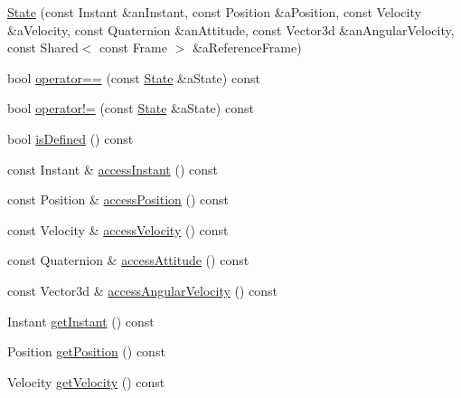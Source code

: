 \begin{DoxyCompactItemize}
\item 
\hyperlink{classostk_1_1astro_1_1flight_1_1profile_1_1_state_aa68f2e3268146c8bcb581beb8dcd5412}{State} (const Instant \&an\+Instant, const Position \&a\+Position, const Velocity \&a\+Velocity, const Quaternion \&an\+Attitude, const Vector3d \&an\+Angular\+Velocity, const Shared$<$ const Frame $>$ \&a\+Reference\+Frame)
\item 
bool \hyperlink{classostk_1_1astro_1_1flight_1_1profile_1_1_state_a4f6023c3c1d9590ec701bf10b0724ebf}{operator==} (const \hyperlink{classostk_1_1astro_1_1flight_1_1profile_1_1_state}{State} \&a\+State) const
\item 
bool \hyperlink{classostk_1_1astro_1_1flight_1_1profile_1_1_state_a300ff5bdda0b2bba50912f95287aba5e}{operator!=} (const \hyperlink{classostk_1_1astro_1_1flight_1_1profile_1_1_state}{State} \&a\+State) const
\item 
bool \hyperlink{classostk_1_1astro_1_1flight_1_1profile_1_1_state_ab69f291582ca4b31c9f340d9d5f83269}{is\+Defined} () const
\item 
const Instant \& \hyperlink{classostk_1_1astro_1_1flight_1_1profile_1_1_state_a6537111ca0de878dc9ccba7fbc037d41}{access\+Instant} () const
\item 
const Position \& \hyperlink{classostk_1_1astro_1_1flight_1_1profile_1_1_state_a92a98a15aac3aff680a619cc925f45c6}{access\+Position} () const
\item 
const Velocity \& \hyperlink{classostk_1_1astro_1_1flight_1_1profile_1_1_state_af24c195994d32133d7ab9dbcc0124aed}{access\+Velocity} () const
\item 
const Quaternion \& \hyperlink{classostk_1_1astro_1_1flight_1_1profile_1_1_state_ad2ce6847d15311d2d1cb7a3662a1d5e4}{access\+Attitude} () const
\item 
const Vector3d \& \hyperlink{classostk_1_1astro_1_1flight_1_1profile_1_1_state_ad0118d95481db7a1bee0820aa20720af}{access\+Angular\+Velocity} () const
\item 
Instant \hyperlink{classostk_1_1astro_1_1flight_1_1profile_1_1_state_aef2c7d2c1f6831280e3933bb2d83a290}{get\+Instant} () const
\item 
Position \hyperlink{classostk_1_1astro_1_1flight_1_1profile_1_1_state_afb70771069e2bc1357ca9e7c885b5dee}{get\+Position} () const
\item 
Velocity \hyperlink{classostk_1_1astro_1_1flight_1_1profile_1_1_state_af6faff1154fb9aeb49685bdb6c5257e2}{get\+Velocity} () const
\item 

\end{DoxyCompactItemize}
